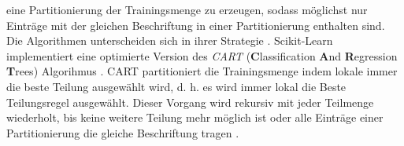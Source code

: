 eine Partitionierung der Trainingsmenge zu erzeugen, sodass möglichst nur Einträge mit der gleichen Beschriftung in einer Partitionierung enthalten sind. Die Algorithmen unterscheiden
sich in ihrer Strategie \cite{quinlan1986induction}.
\newline
\newline
Scikit-Learn implementiert eine optimierte Version des \textit{CART} (\textbf{C}lassification \textbf{A}nd \textbf{R}egression \textbf{T}rees) Algorihmus \cite{ScikitLearnCART}.
CART partitioniert die Trainingsmenge indem lokale immer die beste Teilung ausgewählt wird, d. h. es wird immer lokal die Beste Teilungsregel ausgewählt.
Dieser Vorgang wird rekursiv mit jeder Teilmenge wiederholt, bis keine weitere Teilung mehr möglich ist oder alle Einträge einer Partitionierung die gleiche Beschriftung tragen \cite{steinbergCART}.